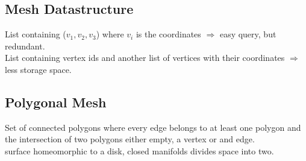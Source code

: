 \subsection*{Mesh Datastructure}
 List containing ($v_1, v_2, v_3$) where $v_i$ is the coordinates $\Rightarrow$ easy query, but redundant.\\
 List containing vertex ids and another list of vertices with their coordinates $\Rightarrow$ less storage space.
\subsection*{Polygonal Mesh} Set of connected polygons where every edge belongs to at least one polygon and the intersection of two polygons either empty, a vertex or and edge.\\
 surface homeomorphic to a disk, closed manifolds divides space into two.

